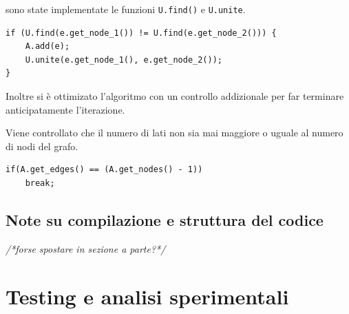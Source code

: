 \documentclass[]{article}
\begin{document}
\begin{flushleft}
\smallskip
sono state implementate le funzioni \verb|U.find()| e \verb|U.unite|.

\lstset{language=c++, style=mystyle, firstnumber=9} 	 	
\begin{lstlisting}
if (U.find(e.get_node_1()) != U.find(e.get_node_2())) {
	A.add(e);
    U.unite(e.get_node_1(), e.get_node_2());
}
\end{lstlisting}

\medskip
Inoltre si è ottimizato l'algoritmo con un controllo addizionale per far terminare anticipatamente l'iterazione. 

Viene controllato che il numero di lati non sia mai maggiore o uguale al numero di nodi del grafo.

\lstset{language=c++, style=mystyle, firstnumber=13}
\begin{lstlisting}
if(A.get_edges() == (A.get_nodes() - 1))
    break;
\end{lstlisting}
\end{flushleft}
\subsection{Note su compilazione e struttura del codice}
\textit{/*forse spostare in sezione a parte?*/}
\section{Testing e analisi sperimentali}
\end{document}
